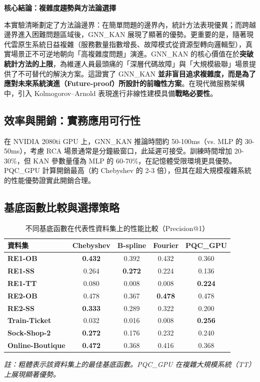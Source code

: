 \documentclass[10pt,a4paper,twocolumn]{article}
\begin{document}
\textbf{核心結論：複雜度趨勢與方法論選擇}

本實驗清晰劃定了方法論邊界：在簡單問題的邊界內，統計方法表現優異；而跨越邊界進入困難問題區域後，GNN\_KAN 展現了顯著的優勢。更重要的是，隨著現代雲原生系統日益複雜（服務數量指數增長、故障模式從資源型轉向邏輯型），真實場景正不可逆地朝向「高複雜度問題」演進。GNN\_KAN 的核心價值在於\textbf{突破統計方法的上限}，為維運人員最頭痛的「深層代碼故障」與「大規模級聯」場景提供了不可替代的解決方案。這證實了 GNN\_KAN \textbf{並非盲目追求複雜度，而是為了應對未來系統演進（Future-proof）所設計的前瞻性方案}。在現代微服務架構中，引入 Kolmogorov–Arnold 表現進行非線性建模具備\textbf{戰略必要性}。

\subsection{效率與開銷：實務應用可行性}

在 NVIDIA 2080ti GPU 上，GNN\_KAN 推論時間約 50-100ms（vs. MLP 的 30-50ms），考慮 RCA 場景通常是分鐘級窗口，此延遲可接受。訓練時間增加 20-30\%，但 KAN 參數量僅為 MLP 的 60-70\%，在記憶體受限環境更具優勢。PQC\_GPU 計算開銷最高（約 Chebyshev 的 2-3 倍），但其在超大規模複雜系統的性能優勢證實此開銷合理。

\subsection{基底函數比較與選擇策略}

\begin{table}[htbp]
\centering
\caption{不同基底函數在代表性資料集上的性能比較（Precision@1）}
\label{tab:basis_comparison}
\small
\begin{tabular}{l|cccc}
\toprule
\textbf{資料集} & \textbf{Chebyshev} & \textbf{B-spline} & \textbf{Fourier} & \textbf{PQC\_GPU} \\
\midrule
\textbf{RE1-OB} & \textbf{0.432} & 0.392 & 0.432 & 0.360 \\
\textbf{RE1-SS} & 0.264 & \textbf{0.272} & 0.224 & 0.136 \\
\textbf{RE1-TT} & 0.080 & 0.008 & 0.008 & \textbf{0.224} \\
\midrule
\textbf{RE2-OB} & 0.478 & 0.367 & \textbf{0.478} & 0.478 \\
\textbf{RE2-SS} & \textbf{0.333} & 0.289 & 0.322 & 0.200 \\
\midrule
\textbf{Train-Ticket} & 0.032 & 0.016 & 0.008 & \textbf{0.256} \\
\textbf{Sock-Shop-2} & \textbf{0.272} & 0.176 & 0.232 & 0.240 \\
\textbf{Online-Boutique} & \textbf{0.472} & 0.368 & 0.416 & 0.368 \\
\bottomrule
\end{tabular}
\vspace{0.2cm}

\small \textit{註：粗體表示該資料集上的最佳基底函數。PQC\_GPU 在複雜大規模系統（TT）上展現顯著優勢。}
\end{table}
\end{document}
